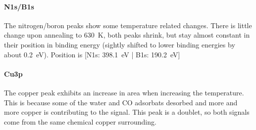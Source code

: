 \paragraph{N1s/B1s}
The nitrogen/boron peaks show some temperature related changes. There is little change upon annealing to \SI{630}{\K}, both peaks shrink, but stay almost constant in their position in binding energy (sightly shifted to lower binding energies by about \SI{0.2}{\eV}). Position is [N1s: \SI{398.1}{\eV} | B1s: \SI{190.2}{\eV}]

\paragraph{Cu3p}
The copper peak exhibits an increase in area when increasing the temperature. This is because some of the water and CO adsorbats desorbed and more and more copper is contributing to the signal. This peak is a doublet, so both signals come from the same chemical copper surrounding.


